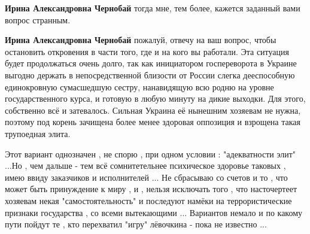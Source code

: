 \begin{itemize}
\begin{itemize}
\textbf{Ирина Александровна Чернобай} тогда мне, тем более, кажется заданный вами вопрос странным.

 
\textbf{Ирина Александровна Чернобай} пожалуй, отвечу на ваш вопрос, чтобы
остановить откровения в части того, где и на кого вы работали. Эта ситуация
будет продолжаться очень долго, так как инициатором госпереворота в Украине
выгодно держать в непосредственной близости от России слегка дееспособную
единокровную сумасшедшую сестру, нанавидящую всю родню на уровне
государственного курса, и готовую в любую минуту на дикие выходки. Для этого,
собственно всё и затевалось. Сильная Украина её нынешним хозяевам не нужна,
поэтому под корень зачищена более менее здоровая оппозиция и взрощена такая
трупоедная элита.

 

Этот вариант однозначен , не спорю , при одном условии : "адекватности элит"
...Но , чем дальше - тем всё сомнитетельнее психическое здоровье таковых , имею
ввиду заказчиков и исполнителей ... Не сбрасываю со счетов и то , что может
быть принуждение к миру , и , нельзя исключать того , что насточертеет хозяевам
некая "самостоятельность" и последуют намёки на террористические признаки
государства , со всеми вытекающими ... Вариантов немало и по какому пути пойдут
те , кто перехватил "игру" лёвочкина - пока не известно ...
\end{itemize}

\end{itemize}

